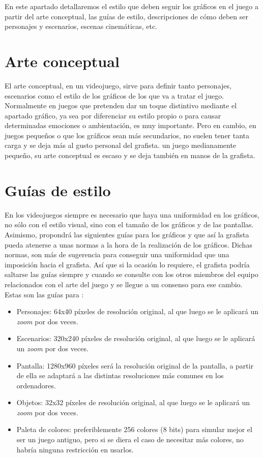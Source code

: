 En este apartado detallaremos el estilo que deben seguir los gráficos en el juego a partir del arte conceptual, las guías de estilo, descripciones de cómo deben ser personajes y escenarios, escenas cinemáticas, etc.

    \section{Arte conceptual}
    El arte conceptual, en un videojuego, sirve para definir tanto personajes, escenarios como el estilo de los gráficos de los que va a tratar el juego. Normalmente en juegos que pretenden dar un toque distintivo mediante el apartado gráfico, ya sea por diferenciar su estilo propio o para causar determinadas emociones o ambientación, es muy importante. Pero en cambio, en juegos pequeños o que los gráficos sean más secundarios, no suelen tener tanta carga y se deja más al gusto personal del grafista. \nombrejuego un juego medianamente pequeño, su arte conceptual es escaso y se deja también en manos de la grafista. 
    
    \section{Guías de estilo}
    En los videojuegos siempre es necesario que haya una uniformidad en los gráficos, no sólo con el estilo visual, sino con el tamaño de los gráficos y de las pantallas. Asimismo, \nombrejuego propondrá las siguientes guías para los gráficos y que así la grafista pueda atenerse a unas normas a la hora de la realización de los gráficos. Dichas normas, son más de sugerencia para conseguir una uniformidad que una imposición hacia el grafista. Así que si la ocasión lo requiere, el grafista podría saltarse las guías siempre y cuando se consulte con los otros miembros del equipo relacionados con el arte del juego y se llegue a un consenso para ese cambio. Estas son las guías para \nombrejuego:
    
    \begin{itemize}
    \item Personajes: 64x40 píxeles de resolución original, al que luego se le aplicará un \emph{zoom} por dos veces.
    \item Escenarios: 320x240 píxeles de resolución original, al que luego se le aplicará un \emph{zoom} por dos veces.
    \item Pantalla: 1280x960 píxeles será la resolución original de la pantalla, a partir de ella se adaptará a las distintas resoluciones más comunes en los ordenadores.
    \item Objetos: 32x32 píxeles de resolución original, al que luego se le aplicará un \emph{zoom} por dos veces.
    \item Paleta de colores: preferiblemente 256 colores (8 bits) para simular mejor el ser un juego antiguo, pero si se diera el caso de necesitar más colores, no habría ninguna restricción en usarlos.
    \end{itemize}
    
